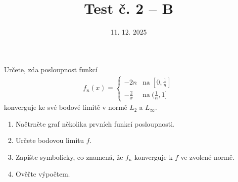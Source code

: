 \documentclass{article}
\begin{document}
\title{Test č. 2 -- B}
\date{11. 12. 2025}
\author{}
\maketitle


\noindent
Určete, zda posloupnost funkcí
\begin{align*}
        f_n(x) = \begin{cases} -2n & \mathrm{na}\; [0,\frac{1}{n}]\\
        -\frac{2}{x} & \mathrm{na}\; (\frac{1}{n},1] \end{cases}
    \end{align*}
konverguje ke své bodové limitě v normě $L_2$ a $L_\infty$.

\vspace{2cm}

\begin{enumerate}
\item Načtrněte graf několika prvních funkcí posloupnosti.
\item Určete bodovou limitu $f$.
\item Zapište symbolicky, co znamená, že $f_n$ konverguje k $f$ ve zvolené normě.
\item Ověřte výpočtem.
\end{enumerate}
\end{document}
